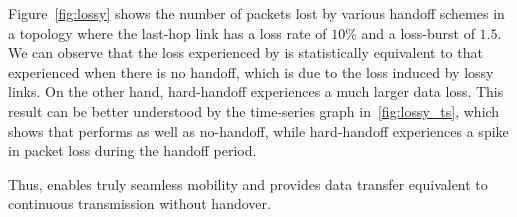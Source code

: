 Figure~\ref{fig:lossy} shows the number of packets lost by various handoff 
schemes in a topology where the last-hop link has a loss rate of $10\%$ and a loss-burst
of $1.5$. 
We can observe that the loss experienced by \sys{} is statistically equivalent to that 
experienced when there is no handoff, which is due to the loss induced by lossy links.
On the other hand, hard-handoff experiences a much larger data loss.
This result can be better understood by the time-series graph in~\ref{fig:lossy_ts}, which 
shows that \sys{} performs as well as no-handoff, while hard-handoff experiences a spike
in packet loss during the handoff period.

Thus, \sys{} enables truly seamless mobility and provides data transfer equivalent to continuous transmission without handover.


